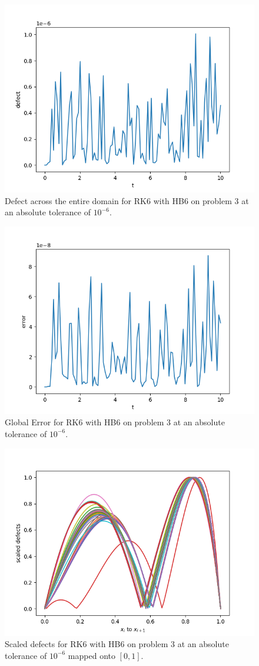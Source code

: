 \begin{figure}[H]
\centering
\includegraphics[width=0.7\linewidth]{./figures/rk6_with_hb6_p3_global_defect}
\caption{Defect across the entire domain for RK6 with HB6 on problem 3 at an absolute tolerance of $10^{-6}$.}
\label{fig:rk6_with_hb6_p3_global_defect}
\end{figure}

\begin{figure}[H]
\centering
\includegraphics[width=0.7\linewidth]{./figures/rk6_with_hb6_p3_global_error}
\caption{Global Error for RK6 with HB6 on problem 3 at an absolute tolerance of $10^{-6}$.}
\label{fig:rk6_with_hb6_p3_global_error}
\end{figure}

\begin{figure}[H]
\centering
\includegraphics[width=0.7\linewidth]{./figures/rk6_with_hb6_p3_scaled_defects}
\caption{Scaled defects for RK6 with HB6 on problem 3 at an absolute tolerance of $10^{-6}$ mapped onto $[0, 1]$.}
\label{fig:rk6_with_hb6_p3_scaled_defects}
\end{figure}

